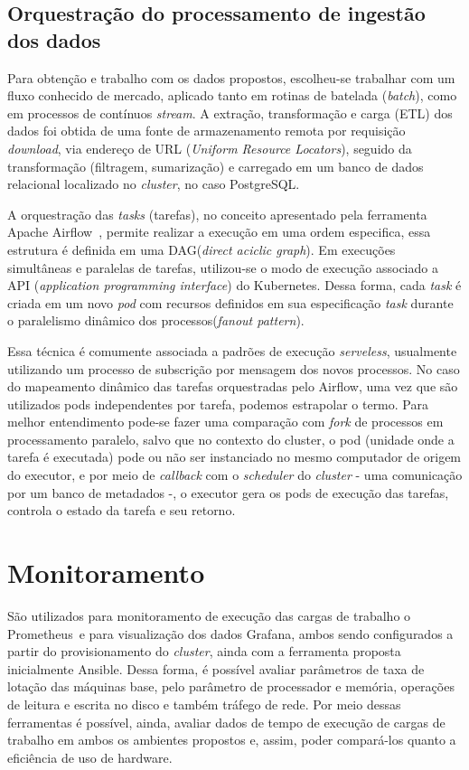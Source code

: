 \subsection{Orquestração do processamento de ingestão dos dados}

Para obtenção e trabalho com os dados propostos, escolheu-se trabalhar com um fluxo conhecido de mercado, aplicado tanto em rotinas de batelada (\emph{batch}), como em processos de contínuos \emph{stream}. A extração, transformação e carga (ETL) dos dados foi obtida de uma fonte de armazenamento remota por requisição \emph{download}, via endereço de URL (\emph{Uniform Resource Locators}), seguido da transformação (filtragem, sumarização) e carregado em um banco de dados relacional localizado no \emph{cluster}, no caso PostgreSQL\textregistered.

A orquestração das \emph{tasks} (tarefas), no conceito apresentado pela ferramenta {Apache Airflow}\textregistered \ \cite{airflowconcepts}, permite realizar a execução em uma ordem especifica, essa estrutura é definida em uma DAG(\emph{direct aciclic graph}). Em execuções simultâneas e paralelas de tarefas, utilizou-se o modo de execução associado a API (\emph{application programming interface}) do Kubernetes\textregistered. Dessa forma, cada \emph{task} é criada em um novo \emph{pod} com recursos definidos em sua especificação \emph{task} durante o paralelismo dinâmico dos processos(\emph{fanout pattern}).

Essa técnica é comumente associada a padrões de execução \emph{serveless}, usualmente utilizando um processo de subscrição por mensagem dos novos processos. No caso do mapeamento dinâmico das tarefas orquestradas pelo Airflow, uma vez que são utilizados pods independentes por tarefa, podemos estrapolar o termo. Para melhor entendimento pode-se fazer uma comparação com \emph{fork} de processos em processamento paralelo, salvo que no contexto do cluster, o pod (unidade onde a tarefa é executada) pode ou não ser instanciado no mesmo computador de origem do executor, e por meio de \emph{callback} com o \emph{scheduler} do \emph{cluster}  - uma comunicação por um banco de metadados -, o executor gera os pods de execução das tarefas, controla o estado da tarefa e seu retorno.


\section{Monitoramento}
\label{chap:monitor}

São utilizados para monitoramento de execução das cargas de trabalho o Prometheus\textregistered \  e para visualização dos dados Grafana\textregistered, ambos sendo configurados a partir do provisionamento do  \emph{cluster}, ainda com a ferramenta proposta inicialmente Ansible\textregistered. Dessa forma, é possível avaliar parâmetros de taxa de lotação das máquinas base, pelo parâmetro de processador e memória, operações de leitura e escrita no disco e também tráfego de rede. Por meio dessas ferramentas é possível, ainda, avaliar dados de tempo de execução de cargas de trabalho em ambos os ambientes propostos e, assim, poder compará-los quanto a eficiência de uso de hardware.

